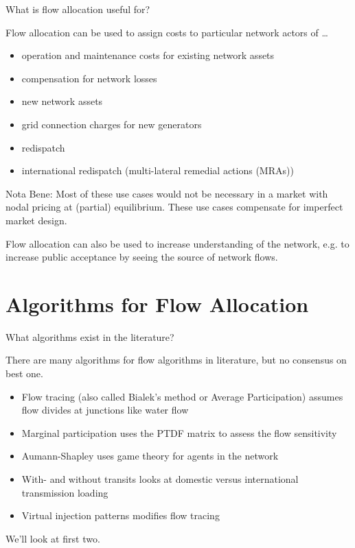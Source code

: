 \documentclass[10pt,aspectratio=169,dvipsnames]{beamer}
\let\olditem\item
\renewcommand{\item}{%
\olditem\vspace{5pt}}
\begin{document}
\begin{frame}{What is flow allocation useful for?}

  Flow allocation can be used to \alert{assign costs} to particular network actors of \dots
  \begin{itemize}
  \item operation and maintenance costs for existing network assets
  \item compensation for network losses
  \item new network assets
  \item grid connection charges for new generators
  \item redispatch
  \item international redispatch (multi-lateral remedial actions (MRAs))
  \end{itemize}

  \alert{Nota Bene}: Most of these use cases would \alert{not} be necessary in a
  market with \alert{nodal pricing} at (partial) \alert{equilibrium}. These use cases compensate for \alert{imperfect market design}.

  Flow allocation can also be used to increase understanding of the network,
  e.g. to increase public acceptance by seeing the source of network flows.

\end{frame}


\section{Algorithms for Flow Allocation}

\begin{frame}{What algorithms exist in the literature?}

  There are many algorithms for flow algorithms in literature, but \alert{no consensus} on best one.

  \begin{itemize}
    \item \alert{Flow tracing} (also called Bialek's method or Average Participation) assumes flow divides at junctions like water flow
    \item \alert{Marginal participation} uses the PTDF matrix to assess the flow sensitivity
    \item \alert{Aumann-Shapley} uses game theory for agents in the network
    \item \alert{With- and without transits} looks at domestic versus international transmission loading
    \item \alert{Virtual injection patterns} modifies flow tracing
  \end{itemize}

  We'll look at first two.

\end{frame}
\end{document}

